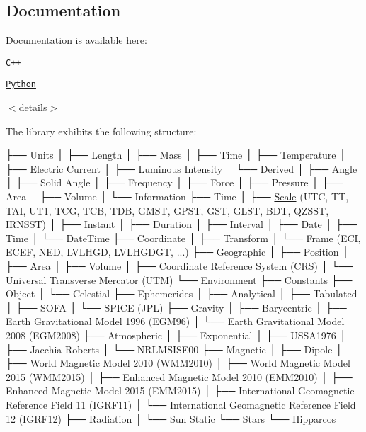 \subsection*{Documentation}

Documentation is available here\+:


\begin{DoxyItemize}
\item \href{https://open-space-collective.github.io/open-space-toolkit-physics}{\tt C++}
\item \href{./bindings/python/docs}{\tt Python}
\end{DoxyItemize}

$<$details$>$

The library exhibits the following structure\+:


\begin{DoxyCode}
├── Units
│   ├── Length
│   ├── Mass
│   ├── Time
│   ├── Temperature
│   ├── Electric Current
│   ├── Luminous Intensity
│   └── Derived
│       ├── Angle
│       ├── Solid Angle
│       ├── Frequency
│       ├── Force
│       ├── Pressure
│       ├── Area
│       ├── Volume
│       └── Information
├── Time
│   ├── \hyperlink{namespaceostk_1_1physics_1_1time_adf23d37bd8641fb76a0e98ab46a70df7}{Scale} (UTC, TT, TAI, UT1, TCG, TCB, TDB, GMST, GPST, GST, GLST, BDT, QZSST, IRNSST)
│   ├── Instant
│   ├── Duration
│   ├── Interval
│   ├── Date
│   ├── Time
│   └── DateTime
├── Coordinate
│   ├── Transform
│   └── Frame (ECI, ECEF, NED, LVLHGD, LVLHGDGT, ...)
├── Geographic
│   ├── Position
│   ├── Area
│   ├── Volume
│   ├── Coordinate Reference System (CRS)
│   └── Universal Transverse Mercator (UTM)
└── Environment
    ├── Constants
    ├── Object
    │   └── Celestial
    ├── Ephemerides
    │   ├── Analytical
    │   ├── Tabulated
    │   ├── SOFA
    │   └── SPICE (JPL)
    ├── Gravity
    │   ├── Barycentric
    │   ├── Earth Gravitational Model 1996 (EGM96)
    │   └── Earth Gravitational Model 2008 (EGM2008)
    ├── Atmospheric
    │   ├── Exponential
    │   ├── USSA1976
    │   ├── Jacchia Roberts
    │   └── NRLMSISE00
    ├── Magnetic
    │   ├── Dipole
    │   ├── World Magnetic Model 2010 (WMM2010)
    │   ├── World Magnetic Model 2015 (WMM2015)
    │   ├── Enhanced Magnetic Model 2010 (EMM2010)
    │   ├── Enhanced Magnetic Model 2015 (EMM2015)
    │   ├── International Geomagnetic Reference Field 11 (IGRF11)
    │   └── International Geomagnetic Reference Field 12 (IGRF12)
    ├── Radiation
    │   └── Sun Static
    └── Stars
        └── Hipparcos
\end{DoxyCode}


